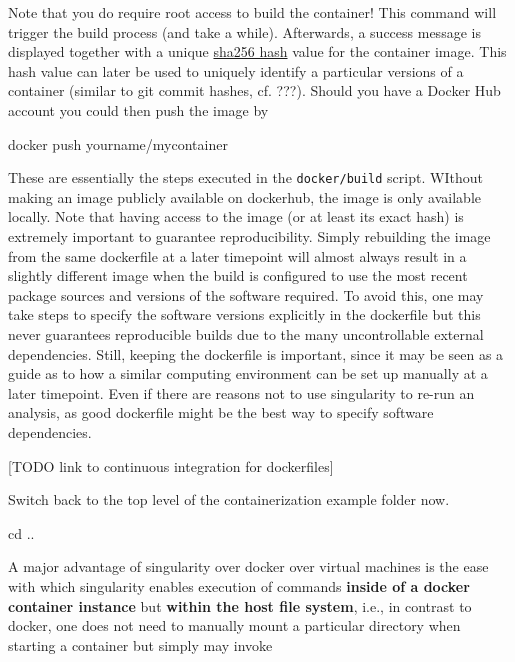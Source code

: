 \documentclass[]{book}
\newenvironment{Shaded}{\begin{snugshade}}{\end{snugshade}}
\newcommand{\BuiltInTok}[1]{#1}
\newcommand{\ExtensionTok}[1]{#1}
\newcommand{\NormalTok}[1]{#1}
\begin{document}
Note that you do require root access to build the container! This
command will trigger the build process (and take a while). Afterwards, a
success message is displayed together with a unique
\href{https://en.wikipedia.org/wiki/SHA-2}{sha256 hash} value for the
container image. This hash value can later be used to uniquely identify
a particular versions of a container (similar to git commit hashes, cf.
???). Should you have a Docker Hub account you could then push the image
by

\begin{Shaded}
\begin{Highlighting}[]
\ExtensionTok{docker}\NormalTok{ push yourname/mycontainer}
\end{Highlighting}
\end{Shaded}

These are essentially the steps executed in the \texttt{docker/build}
script. WIthout making an image publicly available on dockerhub, the
image is only available locally. Note that having access to the image
(or at least its exact hash) is extremely important to guarantee
reproducibility. Simply rebuilding the image from the same dockerfile at
a later timepoint will almost always result in a slightly different
image when the build is configured to use the most recent package
sources and versions of the software required. To avoid this, one may
take steps to specify the software versions explicitly in the dockerfile
but this never guarantees reproducible builds due to the many
uncontrollable external dependencies. Still, keeping the dockerfile is
important, since it may be seen as a guide as to how a similar computing
environment can be set up manually at a later timepoint. Even if there
are reasons not to use singularity to re-run an analysis, as good
dockerfile might be the best way to specify software dependencies.

{[}TODO link to continuous integration for dockerfiles{]}

Switch back to the top level of the containerization example folder now.

\begin{Shaded}
\begin{Highlighting}[]
\BuiltInTok{cd}\NormalTok{ ..}
\end{Highlighting}
\end{Shaded}

A major advantage of singularity over docker over virtual machines is
the ease with which singularity enables execution of commands
\textbf{inside of a docker container instance} but \textbf{within the
host file system}, i.e., in contrast to docker, one does not need to
manually mount a particular directory when starting a container but
simply may invoke
\end{document}
